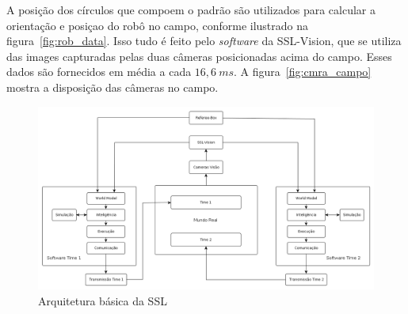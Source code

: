 
A posição dos círculos que compoem o padrão são utilizados para calcular a orientação
e posiçao do robô no campo, conforme ilustrado na figura~\ref{fig:rob_data}. Isso
tudo é feito pelo \textit{software} da SSL-Vision, que se utiliza das images capturadas
pelas duas câmeras posicionadas acima do campo. Esses dados são fornecidos em média a
cada $16,6{\ }ms$. A figura~\ref{fig:cmra_campo} mostra a disposição das câmeras no
campo.


\begin{landscape}
  \begin{figure}[thpb]
    \centering
    \includegraphics[width=20cm]{img/arquitetura_ssl}
    \caption{Arquitetura básica da SSL}\label{arquitetura_ssl}
  \end{figure}
\end{landscape}

